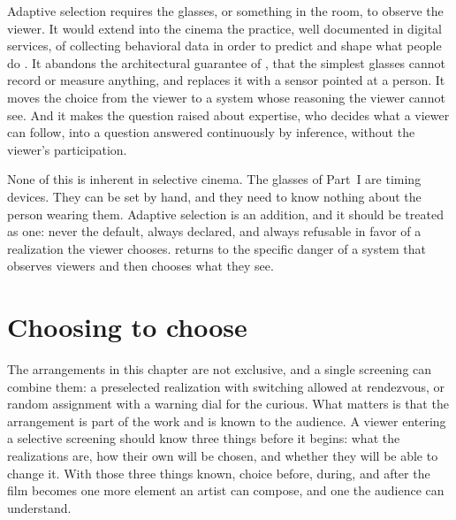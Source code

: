 Adaptive selection requires the glasses, or something in the room, to observe the viewer. It would extend into the cinema the practice, well documented in digital services, of collecting behavioral data in order to predict and shape what people do \cite{zuboff}. It abandons the architectural guarantee of , that the simplest glasses cannot record or measure anything, and replaces it with a sensor pointed at a person. It moves the choice from the viewer to a system whose reasoning the viewer cannot see. And it makes the question  raised about expertise, who decides what a viewer can follow, into a question answered continuously by inference, without the viewer's participation.

None of this is inherent in selective cinema. The glasses of Part~I are timing devices. They can be set by hand, and they need to know nothing about the person wearing them. Adaptive selection is an addition, and it should be treated as one: never the default, always declared, and always refusable in favor of a realization the viewer chooses.  returns to the specific danger of a system that observes viewers and then chooses what they see.

\section{Choosing to choose}

The arrangements in this chapter are not exclusive, and a single screening can combine them: a preselected realization with switching allowed at rendezvous, or random assignment with a warning dial for the curious. What matters is that the arrangement is part of the work and is known to the audience. A viewer entering a selective screening should know three things before it begins: what the realizations are, how their own will be chosen, and whether they will be able to change it. With those three things known, choice before, during, and after the film becomes one more element an artist can compose, and one the audience can understand.
